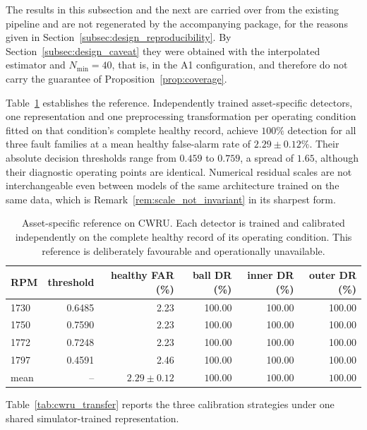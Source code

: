 \documentclass[a4paper]{cas-sc}
\begin{document}
The results in this subsection and the next are carried over from the existing
pipeline and are not regenerated by the accompanying package, for the reasons
given in Section~\ref{subsec:design_reproducibility}. By
Section~\ref{subsec:design_caveat} they were obtained with the interpolated
estimator and \(N_{\min}=40\), that is, in the A1 configuration, and therefore
do not carry the guarantee of Proposition~\ref{prop:coverage}.

Table~\ref{tab:cwru_oracle} establishes the reference. Independently trained
asset-specific detectors, one representation and one preprocessing
transformation per operating condition fitted on that condition's complete
healthy record, achieve \(100\%\) detection for all three fault families at a
mean healthy false-alarm rate of \(2.29\pm 0.12\%\). Their absolute decision
thresholds range from \(0.459\) to \(0.759\), a spread of \(1.65\), although
their diagnostic operating points are identical. Numerical residual scales are
not interchangeable even between models of the same architecture trained on
the same data, which is
Remark~\ref{rem:scale_not_invariant} in its sharpest form.

\begin{table}[!ht]
\centering
\caption{Asset-specific reference on CWRU. Each detector is trained and
calibrated independently on the complete healthy record of its operating
condition. This reference is deliberately favourable and operationally
unavailable.}
\label{tab:cwru_oracle}
\begin{tabular}{lrrrrr}
\toprule
RPM & threshold & healthy FAR (\%) & ball DR (\%) & inner DR (\%) & outer DR (\%) \\
\midrule
1730 & 0.6485 & 2.23 & 100.00 & 100.00 & 100.00 \\
1750 & 0.7590 & 2.23 & 100.00 & 100.00 & 100.00 \\
1772 & 0.7248 & 2.23 & 100.00 & 100.00 & 100.00 \\
1797 & 0.4591 & 2.46 & 100.00 & 100.00 & 100.00 \\
\midrule
mean & --     & $2.29\pm0.12$ & $100.00$ & $100.00$ & $100.00$ \\
\bottomrule
\end{tabular}
\end{table}

Table~\ref{tab:cwru_transfer} reports the three calibration strategies under
one shared simulator-trained representation.
\end{document}

